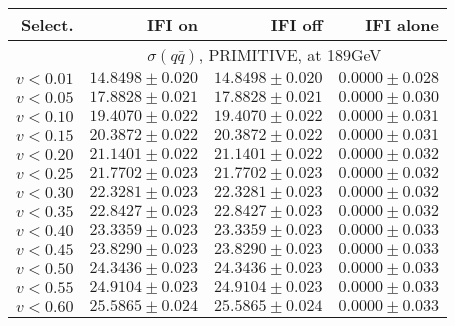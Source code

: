 \documentclass[12pt]{article}
\begin{document}
  
 
 
\begin{table}[!ht]
\centering
\caption{\footnotesize\sf
}
\begin{tabular}                                                                                          {||r|r|r|r||}
\hline\hline
Select.                         &
IFI on                          &
IFI off                         &
IFI alone                       
\\
\hline
& \multicolumn{ 3}{c||}{
     $\sigma(q\bar{q})$, PRIMITIVE, at 189GeV                                         }
\\
\hline
 $ v<0.01$                       & $   14.8498\pm   0.020$ & $   14.8498\pm   0.020$ & $    0.0000\pm   0.028$
\\
 $ v<0.05$                       & $   17.8828\pm   0.021$ & $   17.8828\pm   0.021$ & $    0.0000\pm   0.030$
\\
 $ v<0.10$                       & $   19.4070\pm   0.022$ & $   19.4070\pm   0.022$ & $    0.0000\pm   0.031$
\\
 $ v<0.15$                       & $   20.3872\pm   0.022$ & $   20.3872\pm   0.022$ & $    0.0000\pm   0.031$
\\
 $ v<0.20$                       & $   21.1401\pm   0.022$ & $   21.1401\pm   0.022$ & $    0.0000\pm   0.032$
\\
 $ v<0.25$                       & $   21.7702\pm   0.023$ & $   21.7702\pm   0.023$ & $    0.0000\pm   0.032$
\\
 $ v<0.30$                       & $   22.3281\pm   0.023$ & $   22.3281\pm   0.023$ & $    0.0000\pm   0.032$
\\
 $ v<0.35$                       & $   22.8427\pm   0.023$ & $   22.8427\pm   0.023$ & $    0.0000\pm   0.032$
\\
 $ v<0.40$                       & $   23.3359\pm   0.023$ & $   23.3359\pm   0.023$ & $    0.0000\pm   0.033$
\\
 $ v<0.45$                       & $   23.8290\pm   0.023$ & $   23.8290\pm   0.023$ & $    0.0000\pm   0.033$
\\
 $ v<0.50$                       & $   24.3436\pm   0.023$ & $   24.3436\pm   0.023$ & $    0.0000\pm   0.033$
\\
 $ v<0.55$                       & $   24.9104\pm   0.023$ & $   24.9104\pm   0.023$ & $    0.0000\pm   0.033$
\\
 $ v<0.60$                       & $   25.5865\pm   0.024$ & $   25.5865\pm   0.024$ & $    0.0000\pm   0.033$

\end{tabular}
\end{table}
\end{document}
